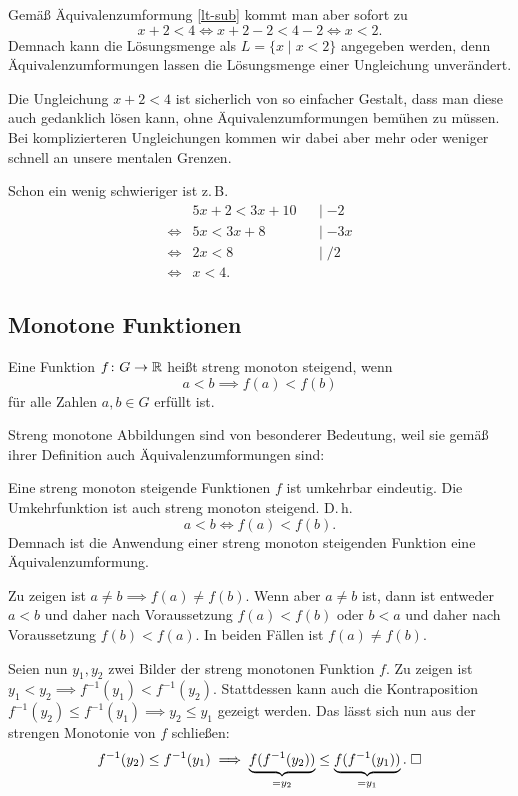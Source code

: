 Gemäß Äquivalenzumformung \eqref{lt-sub} kommt man aber sofort zu
\[x+2<4 \iff x+2-2<4-2 \iff x<2.\]
Demnach kann die Lösungsmenge als $L=\{x\mid x<2\}$ angegeben werden,
denn Äquivalenzumformungen lassen die Lösungsmenge einer Ungleichung
unverändert.

Die Ungleichung $x+2<4$ ist sicherlich von so einfacher Gestalt,
dass man diese auch gedanklich lösen kann, ohne Äquivalenzumformungen
bemühen zu müssen. Bei komplizierteren Ungleichungen kommen wir dabei
aber mehr oder weniger schnell an unsere mentalen Grenzen.

Schon ein wenig schwieriger ist z.\,B.
\begin{align*}
& 5x+2<3x+10 && |\;{-2}\\
\iff & 5x<3x+8 && |\;{-3x}\\
\iff & 2x<8 && |\;{/2}\\
\iff & x<4.
\end{align*}

\subsection{Monotone Funktionen}

\begin{Definition}
Eine Funktion $f\colon G\to\mathbb R$ heißt streng monoton steigend, wenn
\[a<b\implies f(a)<f(b)\]
für alle Zahlen $a,b\in G$ erfüllt ist.
\end{Definition}
Streng monotone Abbildungen sind von besonderer Bedeutung, weil
sie gemäß ihrer Definition auch Äquivalenzumformungen sind:

\begin{Satz}
Eine streng monoton steigende Funktionen $f$ ist umkehrbar eindeutig.
Die Umkehrfunktion ist auch streng monoton steigend. D.\,h.
\[a<b\iff f(a)<f(b).\]
Demnach ist die Anwendung einer streng monoton steigenden
Funktion eine Äquivalenzumformung.
\end{Satz}
\noindent{}
Zu zeigen ist $a\ne b\implies f(a)\ne f(b)$. Wenn aber $a\ne b$
ist, dann ist entweder $a<b$ und daher nach Voraussetzung
$f(a)<f(b)$ oder $b<a$ und daher nach Voraussetzung $f(b)<f(a)$.
In beiden Fällen ist $f(a)\ne f(b)$.

Seien nun $y_1,y_2$ zwei Bilder der streng monotonen Funktion $f$.
Zu zeigen ist $y_1<y_2\implies f^{-1}(y_1)<f^{-1}(y_2)$.
Stattdessen kann auch die Kontraposition
$f^{-1}(y_2)\le f^{-1}(y_1)\implies y_2\le y_1$ gezeigt werden.
Das lässt sich nun aus der strengen Monotonie von $f$ schließen:
\begin{equation}
f^{-1}(y_2)\le f^{-1}(y_1)\implies
\underbrace{f(f^{-1}(y_2))}_{=y_2}\le \underbrace{f(f^{-1}(y_1))}_{=y_1}.\;\Box
\end{equation}

